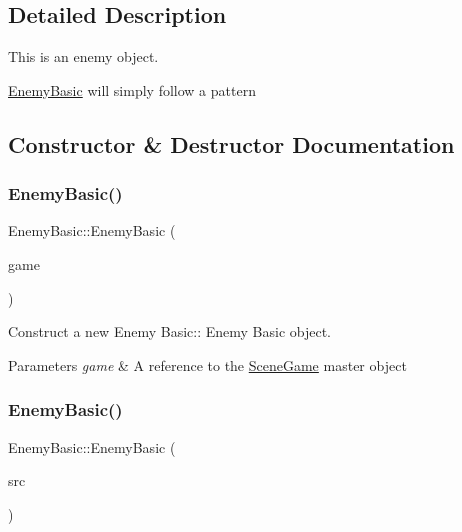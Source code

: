 \subsection{Detailed Description}
This is an enemy object. 

\hyperlink{class_enemy_basic}{Enemy\+Basic} will simply follow a pattern 

\subsection{Constructor \& Destructor Documentation}
\mbox{\label{class_enemy_basic_a1d39809d74f07903c7f6423487598d72}} 
\subsubsection{\texorpdfstring{Enemy\+Basic()}{EnemyBasic()}\hspace{0.1cm}{\footnotesize\ttfamily [1/2]}}
{\footnotesize\ttfamily Enemy\+Basic\+::\+Enemy\+Basic (\begin{DoxyParamCaption}\item[{\hyperlink{class_scene_game}{Scene\+Game} \&}]{game }\end{DoxyParamCaption})\hspace{0.3cm}{\ttfamily [explicit]}}



Construct a new Enemy Basic\+:\+: Enemy Basic object. 


\begin{DoxyParams}{Parameters}
{\em game} & A reference to the \hyperlink{class_scene_game}{Scene\+Game} master object \\
\hline
\end{DoxyParams}
\mbox{\label{class_enemy_basic_ab0f4b466ccb12febf4053b05fbb52b54}} 
\subsubsection{\texorpdfstring{Enemy\+Basic()}{EnemyBasic()}\hspace{0.1cm}{\footnotesize\ttfamily [2/2]}}
{\footnotesize\ttfamily Enemy\+Basic\+::\+Enemy\+Basic (\begin{DoxyParamCaption}\item[{\hyperlink{class_enemy_basic}{Enemy\+Basic} const \&}]{src }\end{DoxyParamCaption})}



